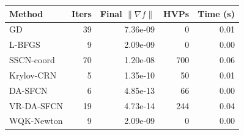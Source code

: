 \begin{tabular}{@{}lrrrr@{}}
\toprule
Method & Iters & Final $\|\nabla f\|$ & HVPs & Time (s) \\
\midrule
GD & 39 & 7.36e-09 & 0 & 0.01 \\
L-BFGS & 9 & 2.09e-09 & 0 & 0.00 \\
SSCN-coord & 70 & 1.20e-08 & 700 & 0.06 \\
Krylov-CRN & 5 & 1.35e-10 & 50 & 0.01 \\
DA-SFCN & 6 & 4.85e-13 & 66 & 0.00 \\
VR-DA-SFCN & 19 & 4.73e-14 & 244 & 0.04 \\
WQK-Newton & 9 & 2.09e-09 & 0 & 0.00 \\
\bottomrule
\end{tabular}